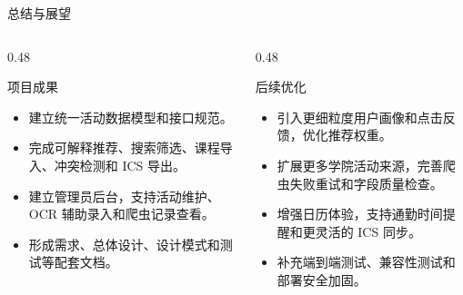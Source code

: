 \documentclass[UTF8,aspectratio=169]{ctexbeamer}
\begin{document}
\begin{frame}{总结与展望}
    \begin{columns}[T,onlytextwidth]
        \begin{column}{0.48\textwidth}
            \begin{block}{项目成果}
                \begin{itemize}
                    \item 建立统一活动数据模型和接口规范。
                    \item 完成可解释推荐、搜索筛选、课程导入、冲突检测和 ICS 导出。
                    \item 建立管理员后台，支持活动维护、OCR 辅助录入和爬虫记录查看。
                    \item 形成需求、总体设计、设计模式和测试等配套文档。
                \end{itemize}
            \end{block}
        \end{column}
        \begin{column}{0.48\textwidth}
            \begin{block}{后续优化}
                \begin{itemize}
                    \item 引入更细粒度用户画像和点击反馈，优化推荐权重。
                    \item 扩展更多学院活动来源，完善爬虫失败重试和字段质量检查。
                    \item 增强日历体验，支持通勤时间提醒和更灵活的 ICS 同步。
                    \item 补充端到端测试、兼容性测试和部署安全加固。
                \end{itemize}
            \end{block}
        \end{column}
    \end{columns}
\end{frame}
\end{document}
